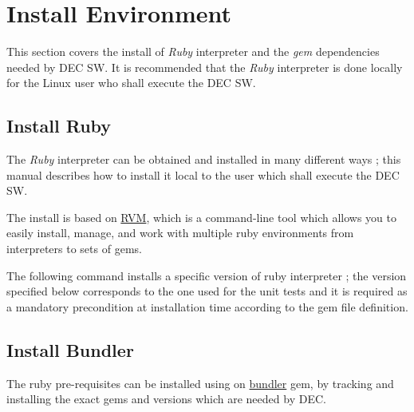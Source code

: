 \documentclass[dec_sum_main.tex]{subfiles}
\begin{document}
\section{Install Environment}

This section covers the install of \textit{Ruby} interpreter and the \textit{gem} dependencies needed by DEC SW. It is recommended that the \textit{Ruby} interpreter is done locally for the Linux user who shall execute the DEC SW.

\par
\noindent

\subsection{Install Ruby}
 
The \textit{Ruby} interpreter can be obtained and installed in many different ways ; this manual describes how to install it local to the user which shall execute the DEC SW.

\par
\noindent
The install is based on \href{https://rvm.io/}{RVM}, which is a command-line tool which allows you to easily install, manage, and work with multiple ruby environments from interpreters to sets of gems. \newline

\par
{} \newline
\par 
\noindent
The following command installs a specific version of ruby interpreter ; the version specified below corresponds to the one used for the unit tests and it is required as a mandatory precondition at installation time according to the gem file definition.\newline

 \newline

\subsection{Install Bundler}

\par
\noindent
The ruby pre-requisites can be installed using on \href{https://bundler.io/}{bundler} gem, by tracking and installing the exact gems and versions which are needed by DEC. 
\end{document}

